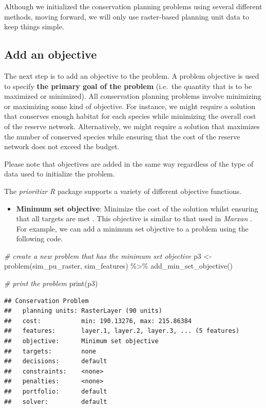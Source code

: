 \documentclass[
  12pt,
]{book}
\newenvironment{Shaded}{\begin{snugshade}}{\end{snugshade}}
\newcommand{\CommentTok}[1]{\textcolor[rgb]{0.56,0.35,0.01}{\textit{#1}}}
\newcommand{\FunctionTok}[1]{\textcolor[rgb]{0.00,0.00,0.00}{#1}}
\newcommand{\NormalTok}[1]{#1}
\newcommand{\OtherTok}[1]{\textcolor[rgb]{0.56,0.35,0.01}{#1}}
\newcommand{\SpecialCharTok}[1]{\textcolor[rgb]{0.00,0.00,0.00}{#1}}
\providecommand{\tightlist}{%
  \setlength{\itemsep}{0pt}\setlength{\parskip}{0pt}}
\begin{document}
Although we initialized the conservation planning problems using several different methods, moving forward, we will only use raster-based planning unit data to keep things simple.

\hypertarget{add-an-objective}{%
\subsection{Add an objective}\label{add-an-objective}}

The next step is to add an objective to the problem. A problem objective is used to specify \textbf{the primary goal of the problem} (i.e.~the quantity that is to be maximized or minimized). All conservation planning problems involve minimizing or maximizing some kind of objective. For instance, we might require a solution that conserves enough habitat for each species while minimizing the overall cost of the reserve network. Alternatively, we might require a solution that maximizes the number of conserved species while ensuring that the cost of the reserve network does not exceed the budget.

Please note that objectives are added in the same way regardless of the type of data used to initialize the problem.

The \emph{prioritizr R} package supports a variety of different objective functions.

\begin{itemize}
\tightlist
\item
  \textbf{Minimum set objective}: Minimize the cost of the solution whilst ensuring that all targets are met \citep{r11}. This objective is similar to that used in \emph{Marxan} \citep{r3}. For example, we can add a minimum set objective to a problem using the following code.
\end{itemize}

\begin{Shaded}
\begin{Highlighting}[]
\CommentTok{\# create a new problem that has the minimum set objective}
\NormalTok{p3 }\OtherTok{\textless{}{-}} \FunctionTok{problem}\NormalTok{(sim\_pu\_raster, sim\_features) }\SpecialCharTok{\%\textgreater{}\%}
  \FunctionTok{add\_min\_set\_objective}\NormalTok{()}

\CommentTok{\# print the problem}
\FunctionTok{print}\NormalTok{(p3)}
\end{Highlighting}
\end{Shaded}

\begin{verbatim}
## Conservation Problem
##   planning units: RasterLayer (90 units)
##   cost:           min: 190.13276, max: 215.86384
##   features:       layer.1, layer.2, layer.3, ... (5 features)
##   objective:      Minimum set objective 
##   targets:        none
##   decisions:      default
##   constraints:    <none>
##   penalties:      <none>
##   portfolio:      default
##   solver:         default
\end{verbatim}
\end{document}
